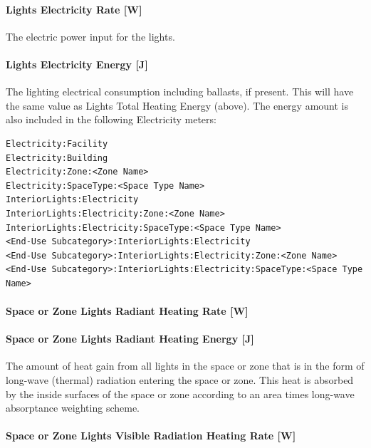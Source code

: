 \paragraph{Lights Electricity Rate {[}W{]}}\label{lights-electric-power-w}

The electric power input for the lights.

\paragraph{Lights Electricity Energy {[}J{]}}\label{lights-electric-energy-j}

The lighting electrical consumption including ballasts, if present. This will have the same value as Lights Total Heating Energy (above).
 The energy amount is also included in the following Electricity meters:
\begin{lstlisting}
Electricity:Facility
Electricity:Building
Electricity:Zone:<Zone Name>
Electricity:SpaceType:<Space Type Name>
InteriorLights:Electricity
InteriorLights:Electricity:Zone:<Zone Name>
InteriorLights:Electricity:SpaceType:<Space Type Name>
<End-Use Subcategory>:InteriorLights:Electricity
<End-Use Subcategory>:InteriorLights:Electricity:Zone:<Zone Name>
<End-Use Subcategory>:InteriorLights:Electricity:SpaceType:<Space Type Name>
\end{lstlisting}

\paragraph{Space or Zone Lights Radiant Heating Rate {[}W{]}}\label{zone-lights-radiant-heating-rate-w}

\paragraph{Space or Zone Lights Radiant Heating Energy {[}J{]}}\label{zone-lights-radiant-heating-energy-j}

The amount of heat gain from all lights in the space or zone that is in the form of long-wave (thermal) radiation entering the space or zone. This heat is absorbed by the inside surfaces of the space or zone according to an area times long-wave absorptance weighting scheme.

\paragraph{Space or Zone Lights Visible Radiation Heating Rate {[}W{]}}\label{zone-lights-visible-radiation-heating-rate-w}

